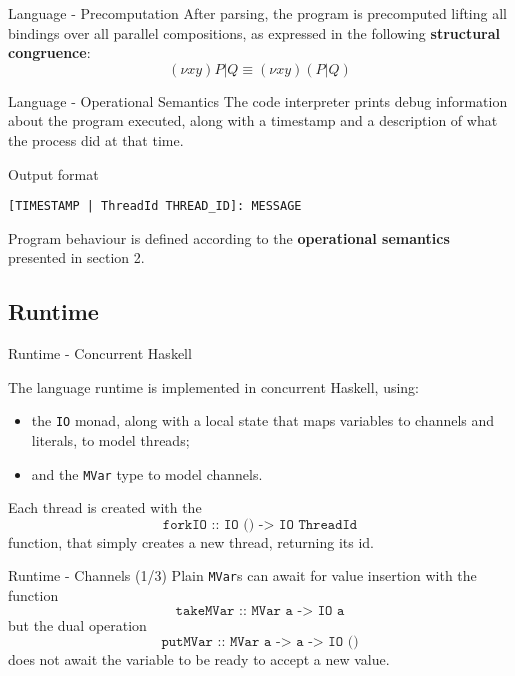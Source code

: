 \begin{frame}{Language - Precomputation}
    After parsing, the program is precomputed lifting all bindings over all parallel compositions, as expressed in the following \textbf{structural congruence}: 
    \[ (\nu x y) P | Q \equiv (\nu x y) (P | Q) \]
\end{frame}

\begin{frame}[fragile]{Language - Operational Semantics}
    The code interpreter prints debug information about the program executed, along with a timestamp and a description of what the process did at that time.

    \begin{block}{Output format}
        \begin{lstlisting}
[TIMESTAMP | ThreadId THREAD_ID]: MESSAGE
        \end{lstlisting}
    \end{block}

    Program behaviour is defined according to the \textbf{operational semantics} presented in section 2.
\end{frame}

\subsection{Runtime}

\begin{frame}{Runtime - Concurrent Haskell}

    The language runtime is implemented in concurrent Haskell, using:
    \begin{itemize}
        \item the \texttt{IO} monad, along with a local state that maps variables to channels and literals, to model threads;
        \item and the \texttt{MVar} type to model channels.
    \end{itemize}

    Each thread is created with the \[ \texttt{forkIO :: IO () -> IO ThreadId} \] function, that simply creates a new thread, returning its id. %
    
\end{frame}

\begin{frame}{Runtime - Channels (1/3)}
    Plain \texttt{MVar}s can await for value insertion with the function \[ \texttt{takeMVar :: MVar a -> IO a} \] but the dual operation \[ \texttt{putMVar :: MVar a -> a -> IO ()} \] does not await the variable to be ready to accept a new value.
\end{frame}


